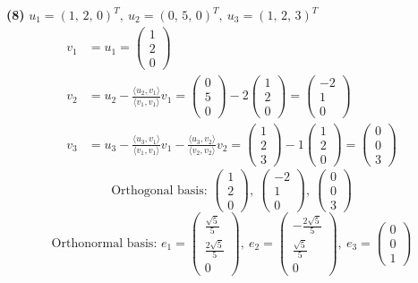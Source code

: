 \noindent\textbf{(8)} $u_1=(1,\,2,\,0)^T,\ u_2=(0,\,5,\,0)^T,\ u_3=(1,\,2,\,3)^T$
\begin{align*}
v_1&=u_1=\begin{pmatrix}1 \\ 2 \\ 0\end{pmatrix} \\
v_2&=u_2-\frac{\langle u_2,v_1\rangle}{\langle v_1,v_1\rangle}v_1=\begin{pmatrix}0 \\ 5 \\ 0\end{pmatrix}-2\begin{pmatrix}1 \\ 2 \\ 0\end{pmatrix}=\begin{pmatrix}-2 \\ 1 \\ 0\end{pmatrix} \\
v_3&=u_3-\frac{\langle u_3,v_1\rangle}{\langle v_1,v_1\rangle}v_1-\frac{\langle u_3,v_2\rangle}{\langle v_2,v_2\rangle}v_2=\begin{pmatrix}1 \\ 2 \\ 3\end{pmatrix}-1\begin{pmatrix}1 \\ 2 \\ 0\end{pmatrix}=\begin{pmatrix}0 \\ 0 \\ 3\end{pmatrix}
\end{align*}
\[ \text{Orthogonal basis: }\begin{pmatrix}1 \\ 2 \\ 0\end{pmatrix},\ \begin{pmatrix}-2 \\ 1 \\ 0\end{pmatrix},\ \begin{pmatrix}0 \\ 0 \\ 3\end{pmatrix} \]
\[ \text{Orthonormal basis: }e_1=\begin{pmatrix}\frac{\sqrt{5}}{5} \\ \frac{2 \sqrt{5}}{5} \\ 0\end{pmatrix},\ e_2=\begin{pmatrix}- \frac{2 \sqrt{5}}{5} \\ \frac{\sqrt{5}}{5} \\ 0\end{pmatrix},\ e_3=\begin{pmatrix}0 \\ 0 \\ 1\end{pmatrix} \]
